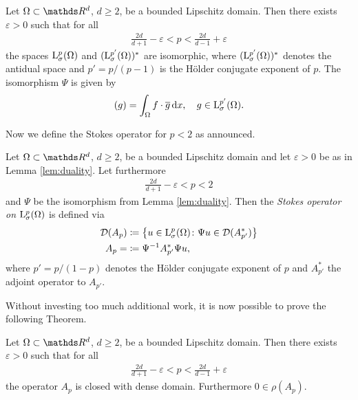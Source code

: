 \begin{lem}
  \label{lem:duality}
  Let $\Omega \subset \R^d$, $d \geq 2$, be a bounded Lipschitz domain.
  Then there exists $\varepsilon > 0$ such that for all 
  \begin{align*}
    \frac{2d}{d + 1} - \varepsilon < p < \frac{2d}{d - 1} + \varepsilon
  \end{align*}
  the spaces $\mathrm{L}^p_\sigma(\Omega)$ and $(\mathrm{L}^{p'}_\sigma(\Omega))^*$ are isomorphic, where $(\mathrm{L}^{p'}_\sigma(\Omega))^*$ denotes the antidual space and $p' = p/ (p - 1)$  is the Hölder conjugate exponent of $p$. 
  The isomorphism $\Psi$ is given by
  \begin{align*}
    [\Psi f](g) = \int_\Omega f \cdot \overline g  \d x, \quad g \in \Ell^{p'}_\sigma(\Omega).
  \end{align*}
\end{lem}

Now we define the Stokes operator for $p < 2$ as announced.

\begin{defn}
  Let $\Omega \subset \R^d$, $d \geq 2$, be a bounded Lipschitz domain and let $\varepsilon > 0$ be as in Lemma \ref{lem:duality}.
  Let furthermore
  \begin{align*}
    \frac{2d}{d + 1} - \varepsilon < p < 2
  \end{align*}
  and $\Psi$ be the isomorphism from Lemma \ref{lem:duality}.
  Then the \emph{Stokes operator on} $\mathrm{L}^p_\sigma(\Omega)$ is defined via
  \begin{align*}
    \mathcal{D}(A_p) & \coloneqq \big\{ u \in \mathrm{L}^p_\sigma(\Omega) \colon \Psi u \in \mathcal{D}(A^*_{p'}) \big\} \\
    A_p = &\coloneqq \Psi^{-1} A^*_{p'} \Psi u,
  \end{align*}
  where $p' = p/(1 - p)$ denotes the Hölder conjugate exponent of $p$ and $A^*_{p'}$ the adjoint operator to $A_{p'}$.
\end{defn}

Without investing too much additional work, it is now possible to prove the following Theorem.

\begin{thm}
  \label{thm:stokesOperatorLp}
  Let $\Omega \subset \R^d$, $d \geq 2$, be a bounded Lipschitz domain. 
  Then there exists $\varepsilon > 0$ such that for all 
  \begin{align*}
    \frac{2d}{d + 1} - \varepsilon < p < \frac{2d}{d - 1} + \varepsilon
  \end{align*}
  the operator $A_p$ is closed with dense domain. Furthermore $0 \in \rho(A_p)$.
\end{thm}

